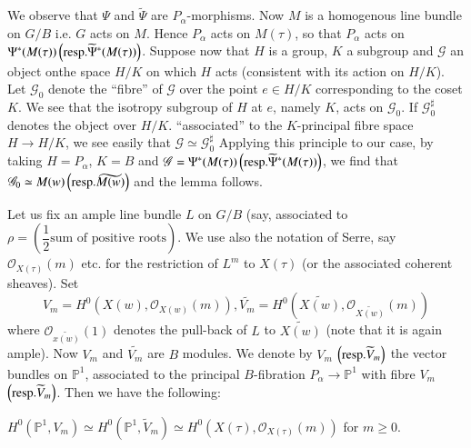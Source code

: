 \begin{Proof}
We observe that $\Psi$ and $\widetilde{\Psi}$ are $P_{\alpha}$-morphisms. Now $M$ is a homogenous line bundle on $G/B$ i.e. $G$ acts on $M$. Hence $P_{\alpha}$ acts on $M(\tau)$, so that $P_{\alpha}$ acts on $\Psi^{\ast}(M(\tau)) \left(\mathrm{resp.} \widetilde{\Psi}^{\ast}(M(\tau))\right)$. Suppose now that $H$ is a group, $K$ a subgroup and $\mathscr{G}$ an object on\pageoriginale the space $H/K$ on which $H$ acts (consistent with its action on $H/K$). Let $\mathscr{G}_0$ denote the ``fibre'' of $\mathscr{G}$ over the point $e \in H/K$ corresponding to the coset $K$. We see that the isotropy subgroup of $H$ at $e$, namely $K$, acts on $\mathscr{G}_0$. If $\mathscr{G}_0^{\sharp}$ denotes the object over $H/K$. ``associated'' to the $K$-principal fibre space $H\to H/K$, we see easily that $\mathscr{G}\simeq \mathscr{G}_0^{\sharp}$ Applying this principle to our case, by taking $H=P_{\alpha}$, $K=B$ and $\mathscr{G}=\Psi^{\ast}(M(\tau))\left(\mathrm{resp.} \widetilde{\Psi}^{\ast}(M(\tau))\right)$, we find that $\mathscr{G}_0\simeq M(w) \left(\mathrm{resp.} \widetilde{M(w)}\right)$ and the lemma follows. 

Let us fix an ample line bundle $L$ on $G/B$ (say, associated to \\$\rho=\left(\dfrac{1}{2} \text{sum of positive roots}\right)$. We use also the notation of Serre, say $\mathscr{O}_{X(\tau)}(m)$ etc. for the restriction of $L^{m}$ to $X(\tau)$ (or the associated coherent sheaves). Set 
$$
V_m=H^{0}(X(w), \mathscr{O}_{X(w)}(m)), \widetilde{V_m}=H^{0}\left(\widetilde{X(w)}, \mathscr{O}_{\widetilde{X(w)}}(m)\right)
$$
where $\mathscr{O}_{\widetilde{x(w)}}(1)$ denotes the pull-back of $L$ to $\widetilde{X(w)}$ (note that it is again ample). Now $V_m$ and $\widetilde{V_m}$ are $B$ modules. We denote by $V_m$ $\left(\mathrm{resp.} \widetilde{V}_m\right)$ the vector bundles on $\mathbb{P}^{1}$, associated to the principal $B$-fibration $P_{\alpha}\to \mathbb{P}^{1}$ with fibre $V_m$ $\left(\mathrm{resp.} \widetilde{V}_m\right)$. Then we have the following: 
\end{Proof}

\begin{lem}\label{lem2}
$H^{0}\left(\mathbb{P}^{1}, V_m\right)\simeq H^{0}\left(\mathbb{P}^{1},\widetilde{V}_m\right)\simeq H^{0} (X(\tau),\mathscr{O}_{X(\tau)}(m))$ for $m\geq 0$. 
\end{lem}

